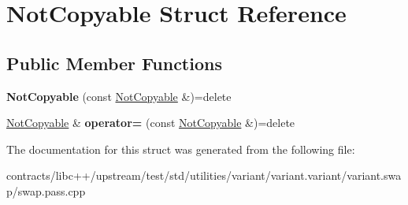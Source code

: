 \hypertarget{struct_not_copyable}{}\section{Not\+Copyable Struct Reference}
\label{struct_not_copyable}
\subsection*{Public Member Functions}
\begin{DoxyCompactItemize}
\item 
\mbox{\label{struct_not_copyable_a59d348136f6fceb82cb68d30f90273a1}} 
{\bfseries Not\+Copyable} (const \mbox{\hyperlink{struct_not_copyable}{Not\+Copyable}} \&)=delete
\item 
\mbox{\label{struct_not_copyable_a37869575f765a67ea09f189e84bb2420}} 
\mbox{\hyperlink{struct_not_copyable}{Not\+Copyable}} \& {\bfseries operator=} (const \mbox{\hyperlink{struct_not_copyable}{Not\+Copyable}} \&)=delete
\end{DoxyCompactItemize}


The documentation for this struct was generated from the following file\+:\begin{DoxyCompactItemize}
\item 
contracts/libc++/upstream/test/std/utilities/variant/variant.\+variant/variant.\+swap/swap.\+pass.\+cpp\end{DoxyCompactItemize}
